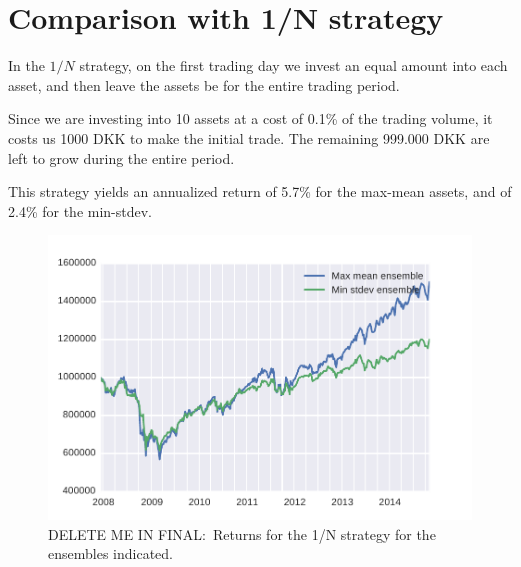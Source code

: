 \section{Comparison with 1/N strategy}

In the $1/N$ strategy, on the first trading day we invest  an equal amount into each asset, and then leave the assets be for the entire trading period.

Since we are investing into 10 assets at a cost of 0.1\% of the trading volume, it costs us 1000 DKK to make the initial trade.
The remaining 999.000 DKK are left to grow during the entire period.

This strategy yields an annualized return of 5.7\% for the max-mean assets, and of 2.4\% for the min-stdev.


\begin{figure}[tp]
\centering
\includegraphics{pic/returns_1overN_only.pdf}
\caption{DELETE ME IN FINAL:\ Returns for the 1/N strategy for the ensembles indicated.}
\label{fig:bondsyield}
\end{figure}
